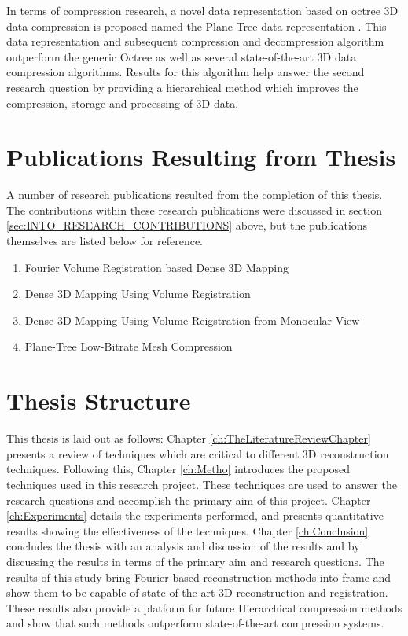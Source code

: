 In terms of compression research, a novel data representation based on octree 3D data compression is proposed named the Plane-Tree data representation \cite{Lincoln15Plane}. This data representation and subsequent compression and decompression algorithm outperform the generic Octree as well as several state-of-the-art 3D data compression algorithms. Results for this algorithm help answer the second research question by providing a hierarchical method which improves the compression, storage and processing of 3D data. \\

\section{Publications Resulting from Thesis}

A number of research publications resulted from the completion of this thesis. The contributions within these research publications were discussed in section \ref{sec:INTO_RESEARCH_CONTRIBUTIONS} above, but the publications themselves are listed below for reference.

\begin{enumerate}
  \item Fourier Volume Registration based Dense 3D Mapping \cite{Lincoln16Fourier}
  \item Dense 3D Mapping Using Volume Registration \cite{Lincoln16Dense}
  \item Dense 3D Mapping Using Volume Reigstration from Monocular View \cite{Lincoln16Monocular}
  \item Plane-Tree Low-Bitrate Mesh Compression \cite{Lincoln15Plane}
\end{enumerate}

\section{Thesis Structure}

This thesis is laid out as follows: Chapter \ref{ch:TheLiteratureReviewChapter} presents a review of techniques which are critical to different 3D reconstruction techniques. Following this, Chapter \ref{ch:Metho} introduces the proposed techniques used in this research project. These techniques are used to answer the research questions and accomplish the primary aim of this project. Chapter \ref{ch:Experiments} details the experiments performed, and presents quantitative results showing the effectiveness of the techniques. Chapter \ref{ch:Conclusion} concludes the thesis with an analysis and discussion of the results and by discussing the results in terms of the primary aim and research questions. The results of this study bring Fourier based reconstruction methods into frame and show them to be capable of state-of-the-art 3D reconstruction and registration. These results also provide a platform for future Hierarchical compression methods and show that such methods outperform state-of-the-art compression systems.

